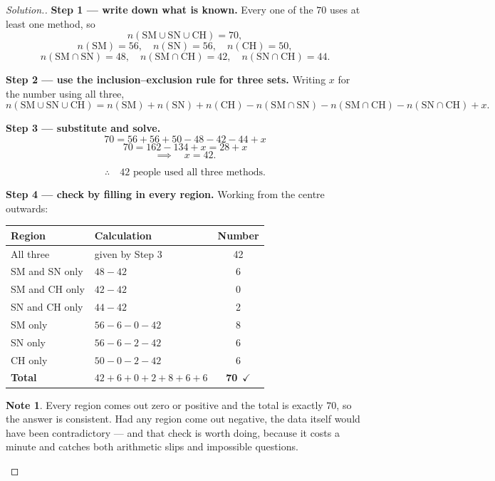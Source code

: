 \documentclass[11pt,a4paper]{article}
\theoremstyle{definition}
\newtheorem{note}[thm]{Note}
\newenvironment{solution}
  {\renewcommand{\qedsymbol}{}\begin{proof}[\textit{Solution}.]}
  {\end{proof}}
\let\amscheckmark\checkmark
\renewcommand{\checkmark}{\ensuremath{\amscheckmark}}
\begin{document}
\begin{solution}
\textbf{Step 1 --- write down what is known.} Every one of the $70$ uses at least one
method, so
$$n(\text{SM}\cup\text{SN}\cup\text{CH})=70,$$
$$n(\text{SM})=56,\quad n(\text{SN})=56,\quad n(\text{CH})=50,$$
$$n(\text{SM}\cap\text{SN})=48,\quad n(\text{SM}\cap\text{CH})=42,\quad
n(\text{SN}\cap\text{CH})=44.$$

\textbf{Step 2 --- use the inclusion--exclusion rule for three sets.} Writing $x$ for
the number using all three,
$$n(\text{SM}\cup\text{SN}\cup\text{CH})=n(\text{SM})+n(\text{SN})+n(\text{CH})
-n(\text{SM}\cap\text{SN})-n(\text{SM}\cap\text{CH})-n(\text{SN}\cap\text{CH})+x.$$

\textbf{Step 3 --- substitute and solve.}
$$70=56+56+50-48-42-44+x$$
$$70=162-134+x=28+x$$
$$\implies\quad x=42.$$

$$\therefore\quad 42 \text{ people used all three methods}.$$

\textbf{Step 4 --- check by filling in every region.} Working from the centre outwards:

\begin{table}[H]
\centering
\begin{tabular}{|l|l|c|}
\hline
Region & Calculation & Number\\
\hline
All three & given by Step 3 & 42\\
SM and SN only & $48-42$ & 6\\
SM and CH only & $42-42$ & 0\\
SN and CH only & $44-42$ & 2\\
SM only & $56-6-0-42$ & 8\\
SN only & $56-6-2-42$ & 6\\
CH only & $50-0-2-42$ & 6\\
\hline
\textbf{Total} & $42+6+0+2+8+6+6$ & \textbf{70}\ \checkmark\\
\hline
\end{tabular}
\end{table}

\begin{note}
Every region comes out zero or positive and the total is exactly $70$, so the answer is
consistent. Had any region come out negative, the data itself would have been
contradictory --- and that check is worth doing, because it costs a minute and catches
both arithmetic slips and impossible questions.
\end{note}
\end{solution}
\end{document}

